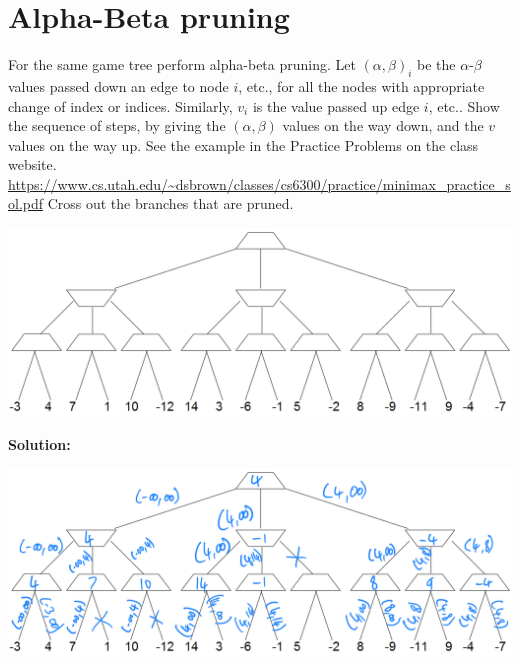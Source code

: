 \documentclass[11pt]{article}
\begin{document}
\section{Alpha-Beta pruning}
For the same game tree perform alpha-beta pruning. Let $(\alpha, \beta)_{i}$ be the
  $\alpha$-$\beta$ values passed down an edge to node $i$, etc., for all
  the nodes with appropriate change of index or indices.  Similarly,
  $v_i$ is the value passed up edge $i$, etc..  Show the sequence of
  steps, by giving the $(\alpha, \beta)$ values on the way down, and the $v$ values
  on the way up. See the example in the Practice Problems on the class website.
  \url{https://www.cs.utah.edu/~dsbrown/classes/cs6300/practice/minimax_practice_sol.pdf}
Cross out the branches
that are pruned.

\begin{center}
\includegraphics[width=\linewidth]{gametree.png}
\end{center}

\bf Solution:

\begin{center}
\includegraphics[width=\linewidth]{Q2.png}
\end{center}
\end{document}
